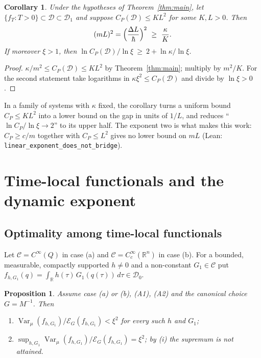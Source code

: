 \documentclass[11pt,a4paper]{article}
\newtheorem{proposition}[theorem]{Proposition}
\newtheorem{corollary}[theorem]{Corollary}
\theoremstyle{definition}
\theoremstyle{remark}
\newcommand{\R}{\mathbb{R}}
\newcommand{\Var}{\operatorname{Var}}
\newcommand{\cE}{\mathcal{E}}
\newcommand{\cD}{\mathcal{D}}
\newcommand{\code}[1]{\texttt{#1}}
\begin{document}
\begin{corollary}\label{cor:gap}
Under the hypotheses of Theorem~\ref{thm:main}, let $\{f_T:T>0\}\subset\cD\subset\cD_1$ and suppose $C_P(\cD)\le K L^2$ for some $K,L>0$. Then
\[
  (mL)^2=\Bigl(\frac{\Delta L}{\hbar}\Bigr)^2\ \ge\ \frac{\kappa}{K}.
\]
If moreover $\xi>1$, then $\ln C_P(\cD)/\ln\xi\ \ge\ 2+\ln\kappa/\ln\xi$.
\end{corollary}

\begin{proof}
$\kappa/m^2\le C_P(\cD)\le KL^2$ by Theorem~\ref{thm:main}; multiply by $m^2/K$.
For the second statement take logarithms in $\kappa\xi^2\le C_P(\cD)$ and divide by $\ln\xi>0$.
\end{proof}

In a family of systems with $\kappa$ fixed, the corollary turns a uniform bound $C_P\le KL^2$ into a lower bound on the gap in units of $1/L$, and reduces ``$\ln C_P/\ln\xi\to2$'' to its upper half.
The exponent two is what makes this work: $C_P\ge c/m$ together with $C_P\le L^2$ gives no lower bound on $mL$ (Lean: \code{linear\_exponent\_does\_not\_bridge}).

\section{Time-local functionals and the dynamic exponent}\label{sec:sokal}

\subsection{Optimality among time-local functionals}

Let $\mathcal C=C^\infty(Q)$ in case (a) and $\mathcal C=C_c^\infty(\R^n)$ in case (b).
For a bounded, measurable, compactly supported $h\ne0$ and a non-constant $G_1\in\mathcal C$ put $f_{h,G_1}(q)=\int_\R h(\tau)\,G_1(q(\tau))\,d\tau\in\cD_0$.

\begin{proposition}\label{prop:optimal}
Assume case (a) or (b), (A1), (A2) and the canonical choice $G=M^{-1}$. Then
\begin{enumerate}[label=(\roman*)]
\item $\Var_\mu(f_{h,G_1})/\cE_G(f_{h,G_1})<\xi^2$ for every such $h$ and $G_1$;
\item $\sup_{h,G_1}\Var_\mu(f_{h,G_1})/\cE_G(f_{h,G_1})=\xi^2$; by (i) the supremum is not attained.
\end{enumerate}
\end{proposition}
\end{document}
